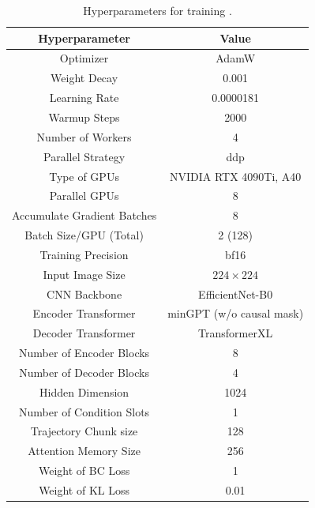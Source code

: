\documentclass[11pt, a4paper, logo, one column]{craftjarvis}
\begin{document}

\begin{table}[h]
\centering
\caption{Hyperparameters for training \agent. } \label{table:parameter}
\begin{tabular}{@{}cc@{}}
\toprule
\textbf{Hyperparameter}  & \textbf{Value}   \\ \midrule
Optimizer                & AdamW     \\
Weight Decay             & 0.001     \\
Learning Rate            & 0.0000181 \\
Warmup Steps             & 2000      \\
Number of Workers        & 4         \\
Parallel Strategy        & ddp       \\
Type of GPUs             & NVIDIA RTX 4090Ti, A40 \\
Parallel GPUs            & 8         \\
Accumulate Gradient Batches & 8      \\
Batch Size/GPU (Total)   & 2 (128)    \\ 
Training Precision       & bf16      \\
Input Image Size         & $224 \times 224$ \\
CNN Backbone                 & EfficientNet-B0  \\
Encoder Transformer      & minGPT (w/o causal mask)  \\
Decoder Transformer      & TransformerXL \\
Number of Encoder Blocks & 8         \\
Number of Decoder Blocks & 4         \\
Hidden Dimension         & 1024      \\
Number of Condition Slots& 1         \\ 
Trajectory Chunk size    & 128       \\
Attention Memory Size    & 256       \\
Weight of BC Loss        & 1         \\
Weight of KL Loss        & 0.01      \\
\bottomrule
\end{tabular}
\end{table}
\end{document}
